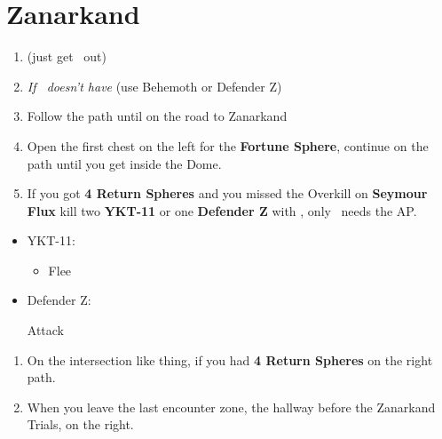 \chapter{Zanarkand}
\begin{enumerate}
    \item \formation{\tidus}{\auron}{\kimahri} (just get \yuna\ out)
    \item \textit{If \rikku\ doesn't have \od} \formation{\tidus}{\auron}{\rikku} (use Behemoth or Defender Z)
    \item Follow the path until on the road to Zanarkand
    \item Open the first chest on the left for the \textbf{Fortune Sphere}, continue on the path until you get inside the Dome.
    \item If you got \textbf{4 Return Spheres} and you missed the Overkill on \textbf{Seymour Flux} kill two \textbf{YKT-11} or one \textbf{Defender Z} with \formation{\tidus}{\auron}{\yuna}, only \yuna\ needs the AP.
\end{enumerate}
\begin{encounters}
    \begin{itemize}
        \item YKT-11:
        \begin{itemize}
            \yunaf Attack
            \tidusf Attack
            \item Flee
        \end{itemize}
        \item Defender Z:
        \begin{itemize}
            \summon{\bahamut}
            \bahamutf Attack
        \end{itemize}
    \end{itemize}
\end{encounters}
\begin{enumerate}[resume]
    \item On the intersection like thing, if you had \textbf{4 Return Spheres}  on the right path.
    \item When you leave the last encounter zone, the hallway before the Zanarkand Trials,  on the right.
\end{enumerate}
